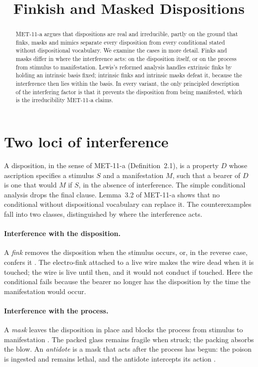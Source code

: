 \documentclass{situationist-preprint}
\title{Finkish and Masked Dispositions}
\begin{document}
\maketitle

\begin{abstract}
MET-11-a argues that dispositions are real and irreducible, partly on the ground that finks, masks and mimics separate every disposition from every conditional stated without dispositional vocabulary. We examine the cases in more detail. Finks and masks differ in where the interference acts: on the disposition itself, or on the process from stimulus to manifestation. Lewis's reformed analysis handles extrinsic finks by holding an intrinsic basis fixed; intrinsic finks and intrinsic masks defeat it, because the interference then lies within the basis. In every variant, the only principled description of the interfering factor is that it prevents the disposition from being manifested, which is the irreducibility MET-11-a claims.
\end{abstract}

\section{Two loci of interference}

A disposition, in the sense of MET-11-a (Definition~2.1), is a property $D$ whose ascription specifies a stimulus $S$ and a manifestation $M$, such that a bearer of $D$ is one that would $M$ if $S$, in the absence of interference. The simple conditional analysis drops the final clause. Lemma~3.2 of MET-11-a shows that no conditional without dispositional vocabulary can replace it. The counterexamples fall into two classes, distinguished by where the interference acts.

\paragraph{Interference with the disposition.} A \emph{fink} removes the disposition when the stimulus occurs, or, in the reverse case, confers it \citep{Martin1994}. The electro-fink attached to a live wire makes the wire dead when it is touched; the wire is live until then, and it would not conduct if touched. Here the conditional fails because the bearer no longer has the disposition by the time the manifestation would occur.

\paragraph{Interference with the process.} A \emph{mask} leaves the disposition in place and blocks the process from stimulus to manifestation \citep{Johnston1992}. The packed glass remains fragile when struck; the packing absorbs the blow. An \emph{antidote} is a mask that acts after the process has begun: the poison is ingested and remains lethal, and the antidote intercepts its action \citep{Bird1998}.
\end{document}
